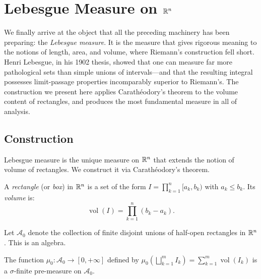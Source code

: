 \chapter{Lebesgue Measure on $\mathbb{R}^n$}
\label{ch:lebesgue}

We finally arrive at the object that all the preceding machinery has been preparing: the \emph{Lebesgue measure}. It is the measure that gives rigorous meaning to the notions of length, area, and volume, where Riemann's construction fell short. Henri Lebesgue, in his 1902 thesis, showed that one can measure far more pathological sets than simple unions of intervals---and that the resulting integral possesses limit-passage properties incomparably superior to Riemann's. The construction we present here applies Carath\'eodory's theorem to the volume content of rectangles, and produces the most fundamental measure in all of analysis.

\section{Construction}

Lebesgue measure is the unique measure on $\mathbb{R}^n$ that extends the notion of volume
of rectangles. We construct it via Carath\'eodory's theorem.

\begin{definition}
A \emph{rectangle} (or \emph{box}) in $\mathbb{R}^n$ is a set of the form
$I = \prod_{k=1}^n [a_k, b_k)$ with $a_k \leq b_k$. Its \emph{volume} is:
\[
\operatorname{vol}(I) = \prod_{k=1}^n (b_k - a_k).
\]
\end{definition}

\begin{definition}
Let $\mathcal{A}_0$ denote the collection of finite disjoint unions of half-open
rectangles in $\mathbb{R}^n$. This is an algebra.
\end{definition}

\begin{proposition}
The function $\mu_0 : \mathcal{A}_0 \to [0, +\infty]$ defined by
$\mu_0\!\left(\bigsqcup_{k=1}^m I_k\right) = \sum_{k=1}^m \operatorname{vol}(I_k)$
is a $\sigma$-finite pre-measure on $\mathcal{A}_0$.
\end{proposition}

